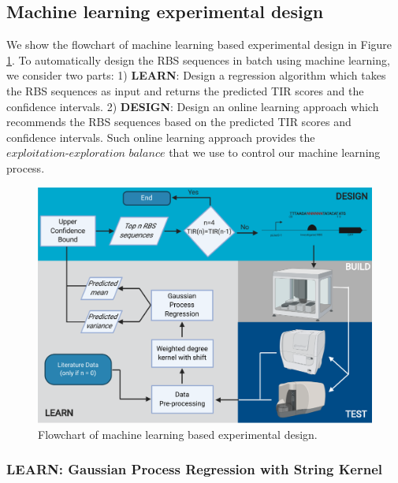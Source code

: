 \subsection{Machine learning experimental design}

We show the flowchart of machine learning based experimental design in Figure \ref{fig: flowchart of machine learning based experimental design.}. 
To automatically design the RBS sequences in batch using machine learning, we consider two parts: 
1) \textbf{LEARN}: Design a regression algorithm which takes the RBS sequences as input and returns the predicted TIR scores and the confidence intervals. 
2) \textbf{DESIGN}: Design an online learning approach which recommends the RBS sequences based on the predicted TIR scores and confidence intervals. 
Such online learning approach provides the $\textit{exploitation-exploration balance}$ that we use to control our machine learning process.

\begin{figure}[h]
    \centering
    \includegraphics[scale=0.7]{plots/flowchart.pdf}
    \caption{Flowchart of machine learning based experimental design.}
    \label{fig: flowchart of machine learning based experimental design.}
\end{figure}

\subsubsection{LEARN: Gaussian Process Regression with String Kernel}

